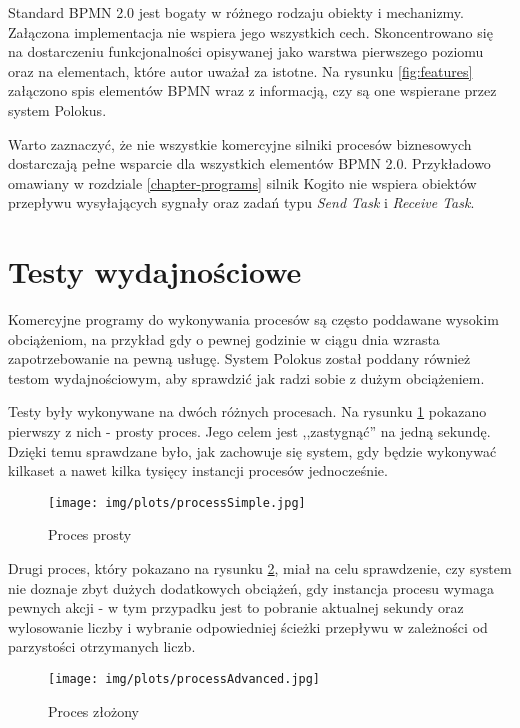 \documentclass[declaration,shortabstract,mgr]{iithesis}
\newcommand{\bpmn}{BPMN }
\begin{document}
Standard \bpmn 2.0 jest bogaty w różnego rodzaju obiekty i mechanizmy. Załączona implementacja nie wspiera jego wszystkich cech. Skoncentrowano się na dostarczeniu funkcjonalności opisywanej jako warstwa pierwszego poziomu oraz na elementach, które autor uważał za istotne. Na rysunku \ref{fig:features} załączono spis elementów \bpmn wraz z informacją, czy są one wspierane przez system Polokus.

Warto zaznaczyć, że nie wszystkie komercyjne silniki procesów biznesowych dostarczają pełne wsparcie dla wszystkich elementów \bpmn 2.0. Przykładowo omawiany w rozdziale \ref{chapter-programs} silnik Kogito nie wspiera obiektów przepływu wysyłających sygnały oraz zadań typu \textit{Send Task} i \textit{Receive Task}.

\section{Testy wydajnościowe}

Komercyjne programy do wykonywania procesów są często poddawane wysokim obciążeniom, na przykład gdy o pewnej godzinie w ciągu dnia wzrasta zapotrzebowanie na pewną usługę. System Polokus został poddany również testom wydajnościowym, aby sprawdzić jak radzi sobie z dużym obciążeniem.

Testy były wykonywane na dwóch różnych procesach. Na rysunku \ref{process-simple} pokazano pierwszy z nich - prosty proces. Jego celem jest ,,zastygnąć'' na jedną sekundę. Dzięki temu sprawdzane było, jak zachowuje się system, gdy będzie wykonywać kilkaset a nawet kilka tysięcy instancji procesów jednocześnie.

\begin{figure}[h]
     \centering
     \texttt{[image: img/plots/processSimple.jpg]}
     \caption{Proces prosty}
     \label{process-simple}
\end{figure}

Drugi proces, który pokazano na rysunku \ref{process-advanced}, miał na celu sprawdzenie, czy system nie doznaje zbyt dużych dodatkowych obciążeń, gdy instancja procesu wymaga pewnych akcji - w tym przypadku jest to pobranie aktualnej sekundy oraz wylosowanie liczby i wybranie odpowiedniej ścieżki przepływu w zależności od parzystości otrzymanych liczb.

\begin{figure}[h]
     \centering
     \texttt{[image: img/plots/processAdvanced.jpg]}
     \caption{Proces złożony}
     \label{process-advanced}
\end{figure}
\end{document}
